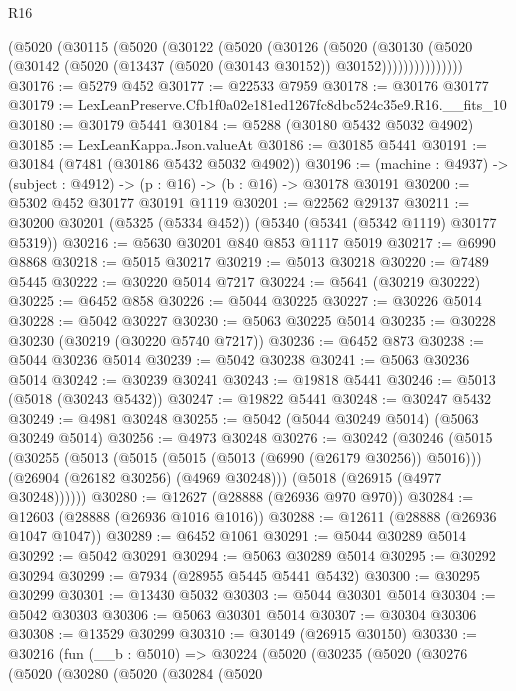 \begin{lexlean}{R16}
\begin{coremodule}
          (@5020
            (@30115
              (@5020
                (@30122
                  (@5020
                    (@30126
                      (@5020
                        (@30130
                          (@5020
                            (@30142 (@5020 (@13437 (@5020 (@30143 @30152)) @30152)))))))))))))))
@30176 := @5279 @452
@30177 := @22533 @7959
@30178 := @30176 @30177
@30179 := LexLeanPreserve.Cfb1f0a02e181ed1267fc8dbc524c35e9.R16.__fits_10
@30180 := @30179 @5441
@30184 := @5288 (@30180 @5432 @5032 @4902)
@30185 := LexLeanKappa.Json.valueAt
@30186 := @30185 @5441
@30191 := @30184 (@7481 (@30186 @5432 @5032 @4902))
@30196 := (machine : @4937) -> (subject : @4912) -> (p : @16) -> (b : @16) -> @30178 @30191
@30200 := @5302 @452 @30177 @30191 @1119
@30201 := @22562 @29137
@30211 := @30200 @30201 (@5325 (@5334 @452)) (@5340 (@5341 (@5342 @1119) @30177 @5319))
@30216 := @5630 @30201 @840 @853 @1117 @5019
@30217 := @6990 @8868
@30218 := @5015 @30217
@30219 := @5013 @30218
@30220 := @7489 @5445
@30222 := @30220 @5014 @7217
@30224 := @5641 (@30219 @30222)
@30225 := @6452 @858
@30226 := @5044 @30225
@30227 := @30226 @5014
@30228 := @5042 @30227
@30230 := @5063 @30225 @5014
@30235 := @30228 @30230 (@30219 (@30220 @5740 @7217))
@30236 := @6452 @873
@30238 := @5044 @30236 @5014
@30239 := @5042 @30238
@30241 := @5063 @30236 @5014
@30242 := @30239 @30241
@30243 := @19818 @5441
@30246 := @5013 (@5018 (@30243 @5432))
@30247 := @19822 @5441
@30248 := @30247 @5432
@30249 := @4981 @30248
@30255 := @5042 (@5044 @30249 @5014) (@5063 @30249 @5014)
@30256 := @4973 @30248
@30276 := @30242
    (@30246
      (@5015
        (@30255
          (@5013
            (@5015 (@5015 (@5013 (@6990 (@26179 @30256)) @5016)))
            (@26904 (@26182 @30256) (@4969 @30248)))
          (@5018 (@26915 (@4977 @30248))))))
@30280 := @12627 (@28888 (@26936 @970 @970))
@30284 := @12603 (@28888 (@26936 @1016 @1016))
@30288 := @12611 (@28888 (@26936 @1047 @1047))
@30289 := @6452 @1061
@30291 := @5044 @30289 @5014
@30292 := @5042 @30291
@30294 := @5063 @30289 @5014
@30295 := @30292 @30294
@30299 := @7934 (@28955 @5445 @5441 @5432)
@30300 := @30295 @30299
@30301 := @13430 @5032
@30303 := @5044 @30301 @5014
@30304 := @5042 @30303
@30306 := @5063 @30301 @5014
@30307 := @30304 @30306
@30308 := @13529 @30299
@30310 := @30149 (@26915 @30150)
@30330 := @30216
    (fun (__b : @5010) =>
    @30224
      (@5020
        (@30235
          (@5020
            (@30276
              (@5020
                (@30280
                  (@5020
                    (@30284
                      (@5020

\end{coremodule}
\end{lexlean}
